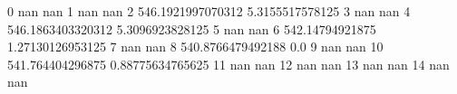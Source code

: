 0 nan nan
1 nan nan
2 546.1921997070312 5.3155517578125
3 nan nan
4 546.1863403320312 5.3096923828125
5 nan nan
6 542.14794921875 1.27130126953125
7 nan nan
8 540.8766479492188 0.0
9 nan nan
10 541.764404296875 0.88775634765625
11 nan nan
12 nan nan
13 nan nan
14 nan nan
